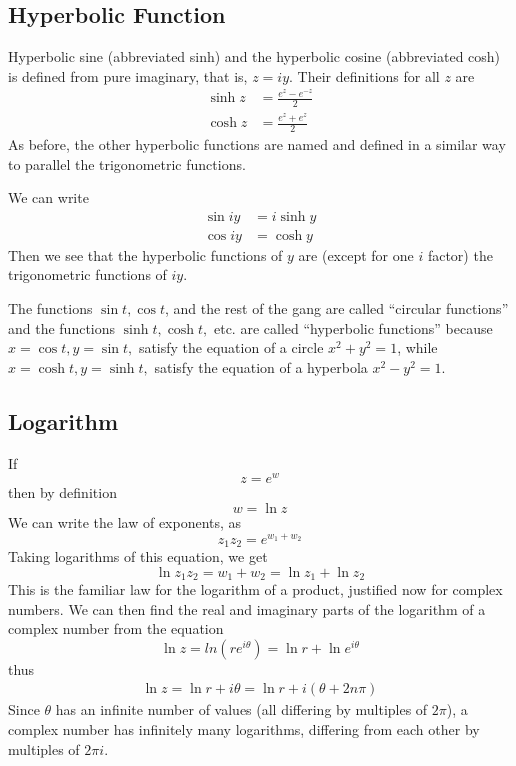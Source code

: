 \documentclass[../../../main.tex]{subfiles}
\begin{document}
\subsection{Hyperbolic Function}

Hyperbolic sine (abbreviated sinh) and the hyperbolic cosine (abbreviated cosh) is defined from pure imaginary, that is, $ z = iy$. Their deﬁnitions for all $z$ are
\begin{align*}
    \sinh z&=\frac{e^{z}-e^{-z}}{2}\\
    \cosh z&=\frac{e^{z}+e^{z}}{2}
\end{align*}
As before, the other hyperbolic functions are named and deﬁned in a similar way to parallel the trigonometric functions. 

We can write 
\begin{align*}
    \sin iy &= i \sinh y\\
    \cos iy&=\cosh y
\end{align*}
Then we see that the hyperbolic functions of $y$ are (except for one $i$ factor) the trigonometric functions of $iy$.

The functions $\sin t, \cos t$, and the rest of the gang are called “circular functions” and the functions $\sinh t, \cosh t,$ etc. are called “hyperbolic functions” because $ x = \cos t, y = \sin t,$ satisfy the equation of a circle $x^2 + y^2 = 1$, while $x = \cosh t,  y = \sinh t,$ satisfy the equation of a hyperbola $x^2 - y^2 = 1$.

\subsection{Logarithm}
If 
\begin{equation*}
    z=e^w
\end{equation*}
then by deﬁnition
\begin{equation*}
    w=\ln z
\end{equation*}
We can write the law of exponents, as
\begin{equation*}
    z_1z_2 = e^{w_1+w_2}
\end{equation*}
Taking logarithms of this equation, we get
\begin{equation*}
   \ln z_1z_2 = {w_1+w_2}=\ln z_1+\ln z_2
\end{equation*}
This is the familiar law for the logarithm of a product, justiﬁed now for complex numbers. We can then ﬁnd the real and imaginary parts of the logarithm of a complex number from the equation
\begin{equation*}
    \ln z = ln(re^{i\theta})=\ln r+\ln e^{i\theta}
\end{equation*}
thus
\begin{align*}
    \ln z = \ln r + i\theta= \ln r + i(\theta+2n\pi)
\end{align*}
Since $\theta$ has an inﬁnite number of values (all diﬀering by multiples of $2\pi$), a complex number has inﬁnitely many logarithms, diﬀering from each other by multiples of $2\pi i$.
\end{document}
